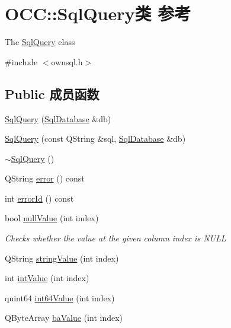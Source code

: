 \hypertarget{class_o_c_c_1_1_sql_query}{}\section{O\+CC\+:\+:Sql\+Query类 参考}
\label{class_o_c_c_1_1_sql_query}


The \hyperlink{class_o_c_c_1_1_sql_query}{Sql\+Query} class  




{\ttfamily \#include $<$ownsql.\+h$>$}

\subsection*{Public 成员函数}
\begin{DoxyCompactItemize}
\item 
\hyperlink{class_o_c_c_1_1_sql_query_af608e0fd4bbc538cb950db626008f5f5}{Sql\+Query} (\hyperlink{class_o_c_c_1_1_sql_database}{Sql\+Database} \&db)
\item 
\hyperlink{class_o_c_c_1_1_sql_query_a5136b36d6287e89f7c55a21ff889635f}{Sql\+Query} (const Q\+String \&sql, \hyperlink{class_o_c_c_1_1_sql_database}{Sql\+Database} \&db)
\item 
\hyperlink{class_o_c_c_1_1_sql_query_a589cb640220779bba44a2f76ebbfe471}{$\sim$\+Sql\+Query} ()
\item 
Q\+String \hyperlink{class_o_c_c_1_1_sql_query_ab745f7e75b1a364ac4f51c8692145a22}{error} () const
\item 
int \hyperlink{class_o_c_c_1_1_sql_query_a863fdad1885a44c10e2f93038bb2ec37}{error\+Id} () const
\item 
bool \hyperlink{class_o_c_c_1_1_sql_query_a894cfaafb62ccdf5d3804f2d6e65d133}{null\+Value} (int index)
\begin{DoxyCompactList}\small\item\em Checks whether the value at the given column index is N\+U\+LL \end{DoxyCompactList}\item 
Q\+String \hyperlink{class_o_c_c_1_1_sql_query_a2348e2dbd9510af10d1033a7f6b509f9}{string\+Value} (int index)
\item 
int \hyperlink{class_o_c_c_1_1_sql_query_ad3ab48614ddc04693d6a94d471b64979}{int\+Value} (int index)
\item 
quint64 \hyperlink{class_o_c_c_1_1_sql_query_aeaabb71b4a382180a6058386416c1814}{int64\+Value} (int index)
\item 
Q\+Byte\+Array \hyperlink{class_o_c_c_1_1_sql_query_a4ae8724d9f039f64fc95ffb070f7536a}{ba\+Value} (int index)

\end{DoxyCompactItemize}
